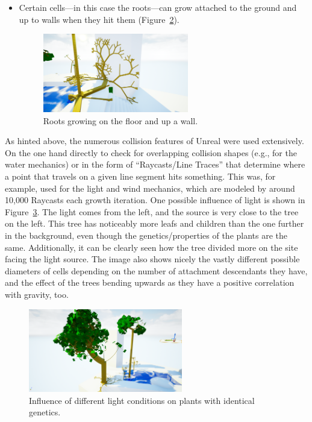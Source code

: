 \documentclass[11pt, abstract=on]{scrartcl}
\begin{document}
\begin{itemize}
\begin{figure}
 		 \label{fig:SelfCollision}
	\end{figure}
	\item Certain cells---in this case the roots---can grow attached to the ground and up to walls when they hit them (Figure~\ref{fig:RootsOnFloor}).
	\begin{figure} 
 		 \centering
 		    \includegraphics[width=0.6\textwidth]{SS_Roots.png}
 		 \caption{Roots growing on the floor and up a wall.}
 		 \label{fig:RootsOnFloor}
	\end{figure}
\end{itemize}
As hinted above, the numerous collision features of Unreal were used extensively. On the one hand directly to check for overlapping collision shapes (e.g., for the water mechanics) or in the form of ``Raycasts/Line Traces'' that determine where a point that travels on a given line segment hits something. This was, for example, used for the light and wind mechanics, which are modeled by around 10,000 Raycasts each growth iteration.
One possible influence of light is shown in Figure~\ref{fig:GrowToLight}. The light comes from the left, and the source is very close to the tree on the left. This tree has noticeably more leafs and children than the one further in the background, even though the genetics/properties of the plants are the same. Additionally, it can be clearly seen how the tree divided more on the site facing the light source. The image also shows nicely the vastly different possible diameters of cells depending on the number of attachment descendants they have, and the effect of the trees bending upwards as they have a positive correlation with gravity, too. 

\begin{figure}
 	 \centering
 	    \includegraphics[width=0.6\textwidth]{SS_GrowToLight.png}
 	 \caption{Influence of different light conditions on plants with identical genetics.}
 	 \label{fig:GrowToLight}
\end{figure}
\end{document}
